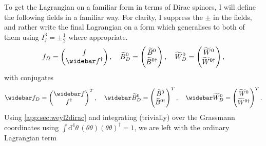 \documentclass[english, notitlepage]{article}
\begin{document}
            To get the Lagrangian on a familiar form in terms of Dirac spinors, I will define the following fields in a familiar way.
            For clarity, I suppress the \(\pm\) in the fields, and rather write the final Lagrangian on a form which generalises to both of them using \(I^3_f = \pm \frac{1}{2}\) where appropriate.
            \begin{align}
                f_D = \begin{pmatrix}
                          f \\ \wbar{f}^\dagger
                      \end{pmatrix},
                \quad
                \wtilde{B}^0_D = \begin{pmatrix}
                                     \wtilde{B}^0 \\ \wtilde{B}^{0 \dagger}
                                 \end{pmatrix},
                \quad
                \wtilde{W}^0_D = \begin{pmatrix}
                                     \wtilde{W}^0 \\ \wtilde{W}^{0 \dagger}
                                 \end{pmatrix},
            \end{align}
            with conjugates
            \begin{align}
                \wbar{f}_D = \begin{pmatrix}
                                 \wbar{f} \\ f^\dagger
                             \end{pmatrix}^T,
                \quad
                \wbar{\wtilde{B}}^0_D = \begin{pmatrix}
                                            \wtilde{B}^0 \\ \wtilde{B}^{0 \dagger}
                                        \end{pmatrix}^T,
                \quad
                \wbar{\wtilde{W}}^0_D = \begin{pmatrix}
                                            \wtilde{W}^0 \\ \wtilde{W}^{0 \dagger}
                                        \end{pmatrix}^T.
            \end{align}
            Using \cref{app:sec:weyl2dirac} and integrating (trivially) over the Grassmann coordinates using \(\int \! \mathrm{d}^4 \theta \,(\theta\theta)(\theta\theta)^\dagger = 1\), we are left with the ordinary Lagrangian term
\end{document}
